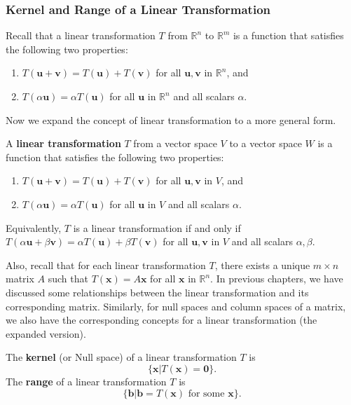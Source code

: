 \documentclass[10pt, a4paper]{article}
\newcommand{\R}{\mathbb{R}}
\begin{document}
\subsubsection*{Kernel and Range of a Linear Transformation}
Recall that a linear transformation $T$ from $\R^n$ to $\R^m$ is a function that satisfies the following two properties:
\begin{enumerate}
    \item $T(\mathbf{u} + \mathbf{v}) = T(\mathbf{u}) + T(\mathbf{v})$ for all $\mathbf{u}, \mathbf{v}$ in $\R^n$, and
    \item $T(\alpha\mathbf{u}) = \alpha T(\mathbf{u})$ for all $\mathbf{u}$ in $\R^n$ and all scalars $\alpha$.
\end{enumerate} 
Now we expand the concept of linear transformation to a more general form.
\begin{definition}
    A \textbf{linear transformation} $T$ from a vector space $V$ to a vector space $W$ is a function that satisfies the following two properties:
    \begin{enumerate}
        \item $T(\mathbf{u} + \mathbf{v}) = T(\mathbf{u}) + T(\mathbf{v})$ for all $\mathbf{u}, \mathbf{v}$ in $V$, and
        \item $T(\alpha\mathbf{u}) = \alpha T(\mathbf{u})$ for all $\mathbf{u}$ in $V$ and all scalars $\alpha$.
    \end{enumerate}
    Equivalently, $T$ is a linear transformation if and only if $T(\alpha\mathbf{u} + \beta\mathbf{v}) = \alpha T(\mathbf{u}) + \beta T(\mathbf{v})$ for all $\mathbf{u}, \mathbf{v}$ in $V$ and all scalars $\alpha, \beta$.
\end{definition}
Also, recall that for each linear transformation $T$, there exists a unique $m\times n$ matrix $A$ such that $T(\mathbf{x}) = A\mathbf{x}$ for all $\mathbf{x}$ in $\R^n$. 
In previous chapters, we have discussed some relationships between the linear transformation and its corresponding matrix. Similarly, for null spaces and column spaces of a matrix, we also have the corresponding concepts for a linear transformation (the expanded version).
\begin{definition}
    The \textbf{kernel} (or Null space) of a linear transformation $T$ is \[
    \{\mathbf{x} | T(\mathbf{x}) = \mathbf{0}\}.
    \]
    The \textbf{range} of a linear transformation $T$ is \[
    \{\mathbf{b} | \mathbf{b} = T(\mathbf{x}) \text{ for some } \mathbf{x}\}.
    \]
\end{definition}
\end{document}
